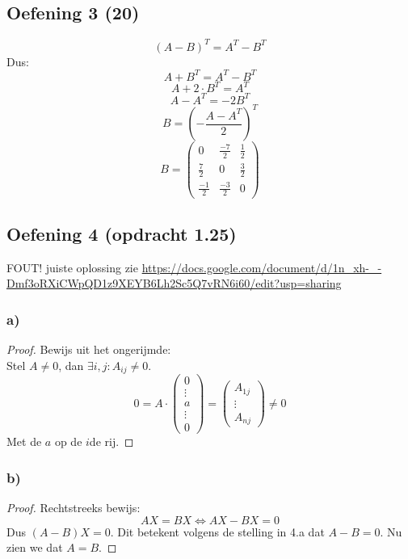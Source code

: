 \documentclass[lineaire_algebra_oplossingen.tex]{subfiles}
\begin{document}
\subsection{Oefening 3 (20)}
$$(A - B)^T = A^T - B^T$$
Dus:
$$A+B^T = A^T - B^T$$
$$A+2\cdot B^T = A^T$$
$$A - A^T = -2B^T$$
$$B = \left(-\frac{A - A^T}{2}\right)^T$$
$$ B = 
\begin{pmatrix}
0 & \frac{-7}{2} & \frac{1}{2}\\
\frac{7}{2} & 0 & \frac{3}{2}\\
\frac{-1}{2} & \frac{-3}{2} & 0
\end{pmatrix}
$$
\subsection{Oefening 4 (opdracht 1.25)}
FOUT! juiste oplossing zie \url{https://docs.google.com/document/d/1n_xh-_-Dmf3oRXiCWpQD1z9XEYB6Lh2Sc5Q7vRN6i60/edit?usp=sharing}
\subsubsection*{a)}
\begin{proof}
Bewijs uit het ongerijmde:\\
Stel $A \neq 0$, dan $\exists i, j: A_{ij} \neq 0$.
\[
0= A \cdot
\begin{pmatrix}
0\\\vdots\\a\\\vdots\\0
\end{pmatrix}
=
\begin{pmatrix}
A_{1j}\\\vdots\\A_{nj}
\end{pmatrix}
\neq 0
\]
Met de $a$ op de $i$de rij.
\end{proof}

\subsubsection*{b)}
\begin{proof}
Rechtstreeks bewijs:\\
\[
AX=BX \Leftrightarrow AX - BX=0
\]
Dus $(A-B)X=0$.
Dit betekent volgens de stelling in 4.a dat $A-B=0$.
Nu zien we dat $A=B$.
\end{proof}
\end{document}
